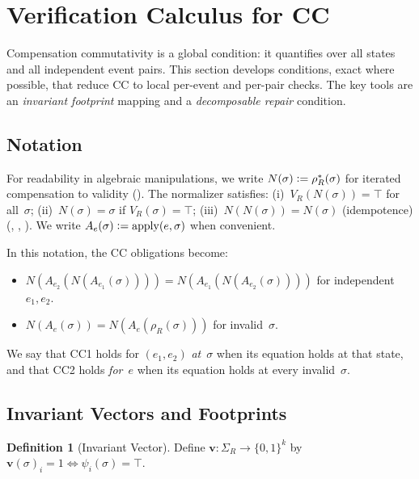 \documentclass[11pt,a4paper]{article}
\theoremstyle{plain}
\theoremstyle{definition}
\newtheorem{definition}[theorem]{Definition}
\theoremstyle{remark}
\newcommand{\defeq}{\vcentcolon=}
\renewcommand{\_}{\textunderscore\allowbreak}
\begin{document}
\section{Verification Calculus for CC}
\label{sec:calculus}

Compensation commutativity is a global condition: it quantifies over all states
and all independent event pairs.  This section develops conditions, exact
where possible, that reduce CC to local per-event and per-pair checks.  The key tools are an
\emph{invariant footprint} mapping and a \emph{decomposable repair} condition.

\subsection{Notation}

For readability in algebraic manipulations, we write
$N(\sigma) \defeq \rho_R^*(\sigma)$ for iterated compensation to validity
().  The normalizer satisfies: (i)~$V_R(N(\sigma)) = \top$
for all~$\sigma$; (ii)~$N(\sigma) = \sigma$ if $V_R(\sigma) = \top$;
(iii)~$N(N(\sigma)) = N(\sigma)$ (idempotence) (,
, ).  We write
$A_e(\sigma) \defeq \mathrm{apply}(e, \sigma)$ when convenient.

In this notation, the CC obligations become:
\begin{itemize}[leftmargin=*,nosep]
\item[\textbf{(CC1)}] $N(A_{e_2}(N(A_{e_1}(\sigma)))) =
  N(A_{e_1}(N(A_{e_2}(\sigma))))$ for independent $e_1, e_2$.
\item[\textbf{(CC2)}] $N(A_e(\sigma)) = N(A_e(\rho_R(\sigma)))$ for
  invalid~$\sigma$.
\end{itemize}
We say that CC1 holds for $(e_1, e_2)$ \emph{at}~$\sigma$ when its equation
holds at that state, and that CC2 holds \emph{for}~$e$ when its equation holds
at every invalid~$\sigma$.

\subsection{Invariant Vectors and Footprints}

\begin{definition}[Invariant Vector]
\label{def:inv-vector}
Define $\mathbf{v}: \Sigma_R \to \{0,1\}^k$ by
$\mathbf{v}(\sigma)_i = 1 \iff \psi_i(\sigma) = \top$.
\end{definition}
\end{document}
